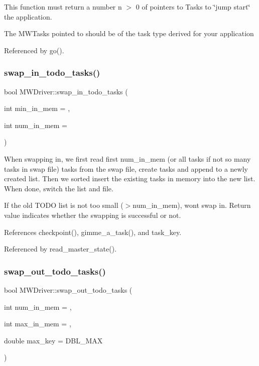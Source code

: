 This function must return a number n $>$ 0 of pointers to Tasks to \char`\"{}jump start\char`\"{} the application.

The M\+W\+Tasks pointed to should be of the task type derived for your application 

Referenced by go().

\mbox{\label{classMWDriver_aaa70ab2dd6087ef2415824f770747f8f}} 
\subsubsection{\texorpdfstring{swap\+\_\+in\+\_\+todo\+\_\+tasks()}{swap\_in\_todo\_tasks()}}
{\footnotesize\ttfamily bool M\+W\+Driver\+::swap\+\_\+in\+\_\+todo\+\_\+tasks (\begin{DoxyParamCaption}\item[{int}]{min\+\_\+in\+\_\+mem = {},  }\item[{int}]{num\+\_\+in\+\_\+mem = {} }\end{DoxyParamCaption})}

When swapping in, we first read first num\+\_\+in\+\_\+mem (or all tasks if not so many tasks in swap file) tasks from the swap file, create tasks and append to a newly created list. Then we sorted insert the existing tasks in memory into the new list. When done, switch the list and file.

If the old T\+O\+DO list is not too small ($>$num\+\_\+in\+\_\+mem), won\textquotesingle{}t swap in. Return value indicates whether the swapping is successful or not. 

References checkpoint(), gimme\+\_\+a\+\_\+task(), and task\+\_\+key.



Referenced by read\+\_\+master\+\_\+state().

\mbox{\label{classMWDriver_afa05516157b292a420ba6770fd2f493c}} 
\subsubsection{\texorpdfstring{swap\+\_\+out\+\_\+todo\+\_\+tasks()}{swap\_out\_todo\_tasks()}}
{\footnotesize\ttfamily bool M\+W\+Driver\+::swap\+\_\+out\+\_\+todo\+\_\+tasks (\begin{DoxyParamCaption}\item[{int}]{num\+\_\+in\+\_\+mem = {},  }\item[{int}]{max\+\_\+in\+\_\+mem = {},  }\item[{double}]{max\+\_\+key = {\ttfamily DBL\+\_\+MAX} }\end{DoxyParamCaption})}

